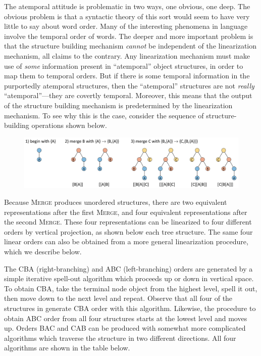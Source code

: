 The atemporal attitude is problematic in two ways, one obvious, one deep. The obvious problem is that a syntactic theory of this sort would seem to have very little to say about word order. Many of the interesting phenomena in language involve the temporal order of words. The deeper and more important problem is that the structure building mechanism \textit{cannot} be independent of the linearization mechanism, all claims to the contrary. Any linearization mechanism must make use of \textit{some} information present in “atemporal” object structures, in order to map them to temporal orders. But if there is some temporal information in the purportedly atemporal structures, then the “atemporal” structures are not \textit{really} “atemporal”—they are covertly temporal. Moreover, this means that the output of the structure building mechanism is predetermined by the linearization mechanism. To see why this is the  case, consider the sequence of structure-building operations shown below.

  
\begin{figure}
\includegraphics[width=\textwidth]{figures/Tilsen-img42.png}
\caption{\missingcaption}
\label{fig:}
\end{figure}
 

  Because \textsc{Merge} produces unordered structures, there are two equivalent representations after the first \textsc{Merge}, and four equivalent representations after the second \textsc{Merge}. These four representations can be linearized to four different orders by vertical projection, as shown below each tree structure. The same four linear orders can also be obtained from a more general linearization procedure, which we describe below.

  The CBA (right-branching) and ABC (left-branching) orders are generated by a simple iterative spell-out algorithm which proceeds up or down in vertical space. To obtain CBA, take the terminal node object from the highest level, spell it out, then move down to the next level and repeat. Observe that all four of the structures in  generate CBA order with this algorithm. Likewise, the procedure to obtain ABC order from all four structures starts at the lowest level and moves up. Orders BAC and CAB can be produced with somewhat more complicated algorithms which traverse the structure in two different directions. All four algorithms are shown in the table below. 

